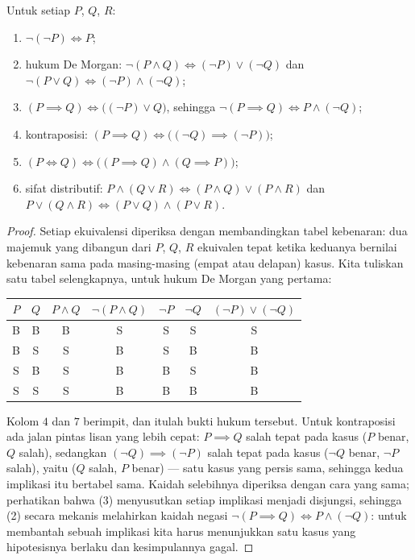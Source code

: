 \begin{proposition}\label{prop:b1:logic:rules}
Untuk setiap  $P$, $Q$, $R$:
\begin{enumerate}
  \item $\lnot(\lnot P) \iff P$;
  \item hukum De Morgan:
        $\lnot(P \land Q) \iff (\lnot P) \lor (\lnot Q)$ dan
        $\lnot(P \lor Q) \iff (\lnot P) \land (\lnot Q)$;
  \item $(P \implies Q) \iff \bigl((\lnot P) \lor Q\bigr)$, sehingga
        $\lnot(P \implies Q) \iff P \land (\lnot Q)$;
  \item kontraposisi:
        $(P \implies Q) \iff \bigl((\lnot Q) \implies (\lnot P)\bigr)$;
  \item $(P \iff Q) \iff \bigl((P \implies Q) \land (Q \implies
        P)\bigr)$;
  \item sifat distributif: $P \land (Q \lor R) \iff (P \land Q) \lor
        (P \land R)$ dan $P \lor (Q \land R) \iff (P \lor Q) \land
        (P \lor R)$.
\end{enumerate}
\end{proposition}

\begin{proof}
Setiap ekuivalensi diperiksa dengan membandingkan tabel kebenaran: dua
 majemuk yang dibangun dari $P$, $Q$, $R$ ekuivalen tepat
ketika keduanya bernilai kebenaran sama pada masing-masing (empat atau
delapan) kasus. Kita tuliskan satu tabel selengkapnya, untuk hukum De
Morgan yang pertama:
\begin{center}
\begin{tabular}{cc|c|c|cc|c}
$P$ & $Q$ & $P \land Q$ & $\lnot(P \land Q)$ & $\lnot P$ & $\lnot Q$ &
$(\lnot P) \lor (\lnot Q)$ \\
\hline
B & B & B & S & S & S & S \\
B & S & S & B & S & B & B \\
S & B & S & B & B & S & B \\
S & S & S & B & B & B & B \\
\end{tabular}
\end{center}
Kolom $4$ dan $7$ berimpit, dan itulah bukti hukum tersebut. Untuk
kontraposisi ada jalan pintas lisan yang lebih cepat: $P \implies Q$
salah tepat pada kasus ($P$ benar, $Q$ salah), sedangkan
$(\lnot Q) \implies (\lnot P)$ salah tepat pada kasus ($\lnot Q$
benar, $\lnot P$ salah), yaitu ($Q$ salah, $P$ benar) --- satu kasus
yang persis sama, sehingga kedua implikasi itu bertabel sama. Kaidah
selebihnya diperiksa dengan cara yang sama; perhatikan bahwa (3)
menyusutkan setiap implikasi menjadi disjungsi, sehingga (2) secara
mekanis melahirkan kaidah negasi $\lnot(P \implies Q) \iff P
\land (\lnot Q)$: untuk membantah sebuah implikasi kita harus
menunjukkan satu kasus yang hipotesisnya berlaku dan kesimpulannya
gagal.
\end{proof}


